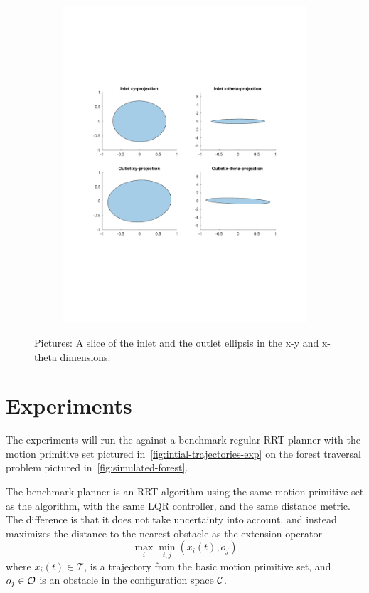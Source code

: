\begin{figure}
\begin{subfigure}[b]{0.4\textwidth}
    \includegraphics[width=\textwidth]{figures/experiments/sos-calculation-inlet-outlet}
  \end{subfigure}
  \caption{Pictures: A slice of the inlet and the outlet ellipsis in the x-y and
    x-theta dimensions.}
\end{figure}

\section{Experiments}

The experiments will run the \rrtfunnel{} against a benchmark regular RRT
planner with the motion primitive set pictured
in~\cref{fig:intial-trajectories-exp} on the forest traversal problem pictured
in~\cref{fig:simulated-forest}.

The benchmark-planner is an \ac{RRT} algorithm using the same motion primitive
set as the \rrtfunnel{} algorithm, with the same \ac{LQR} controller, and the
same distance metric. The difference is that it does not take uncertainty into
account, and instead maximizes the distance to the nearest obstacle as the
extension operator \ie{}
\begin{equation}
  \max_{i}\min_{t,j}(x_{i}(t), o_{j})
\end{equation}
where \(x_{i}(t) \in \mathcal{T}\), is a trajectory from the basic motion
primitive set, and \(o_{j} \in \mathcal{O}{}\) is an obstacle in the
configuration space \(\mathcal{C}{}\).

